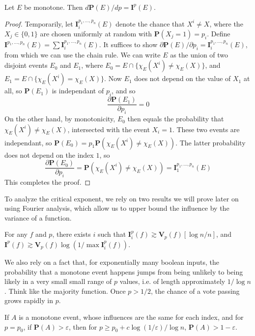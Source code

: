 \begin{theorem}
    Let $E$ be monotone. Then $d\mathbf{P}(E)/dp = \mathbf{I}^p(E)$.
\end{theorem}
\begin{proof}
    Temporarily, let $\mathbf{I}_i^{p_1, \dots, p_n}(E)$ denote the chance that $X^i \neq X$, where the $X_j \in \{ 0, 1 \}$ are chosen uniformly at random with $\mathbf{P}(X_j = 1) = p_i$. Define $\mathbf{I}^{p_1, \dots, p_n}(E) = \sum \mathbf{I}^{p_1, \dots, p_n}_i(E)$. It suffices to show $\partial \mathbf{P}(E) / \partial p_i = \mathbf{I}_i^{p_1,\dots,p_n}(E)$, from which we can use the chain rule. We can write $E$ as the union of two disjoint events $E_0$ and $E_1$, where $E_0 = E \cap \{ \chi_E(X^i) \neq \chi_E(X) \}$, and $E_1 = E \cap \{ \chi_E(X^i) = \chi_E(X) \}$. Now $E_1$ does not depend on the value of $X_1$ at all, so $\mathbf{P}(E_1)$ is independant of $p_i$, and so
    \[ \frac{\partial \mathbf{P}(E_1)}{\partial p_i} = 0 \]
    On the other hand, by monotonicity, $E_0$ then equals the probability that $\chi_E(X^i) \neq \chi_E(X)$, intersected with the event $X_i = 1$. These two events are independant, so $\mathbf{P}(E_0) = p_1 \mathbf{P}(\chi_E(X^i) \neq \chi_E(X))$. The latter probability does not depend on the index $1$, so
    \[ \frac{\partial \mathbf{P}(E_0)}{\partial p_i} = \mathbf{P}(\chi_E(X^i) \neq \chi_E(X)) = \mathbf{I}^{p_1, \dots, p_n}_1(E) \]
    This completes the proof.
\end{proof}

To analyze the critical exponent, we rely on two results we will prove later on using Fourier analysis, which allow us to upper bound the influence by the variance of a function.

\begin{theorem}
    For any $f$ and $p$, there exists $i$ such that $\mathbf{I}_i^p(f) \gtrsim \mathbf{V}_p(f) [\log n / n]$, and $\mathbf{I}^p(f) \gtrsim \mathbf{V}_p(f) \log(1/\max \mathbf{I}_i^p(f))$.
\end{theorem}

We also rely on a fact that, for exponentially many boolean inputs, the probability that a monotone event happens jumps from being unlikely to being likely in a very small small range of $p$ values, i.e. of length approximately $1/\log n$. Think like the majority function. Once $p > 1/2$, the chance of a vote passing grows rapidly in $p$.

\begin{theorem}
    If $A$ is a monotone event, whose influences are the same for each index, and for $p = p_0$, if $\mathbf{P}(A) > \varepsilon$, then for $p \geq p_0 + c \log(1/\varepsilon)/\log n$, $\mathbf{P}(A) > 1 - \varepsilon$.
\end{theorem}

